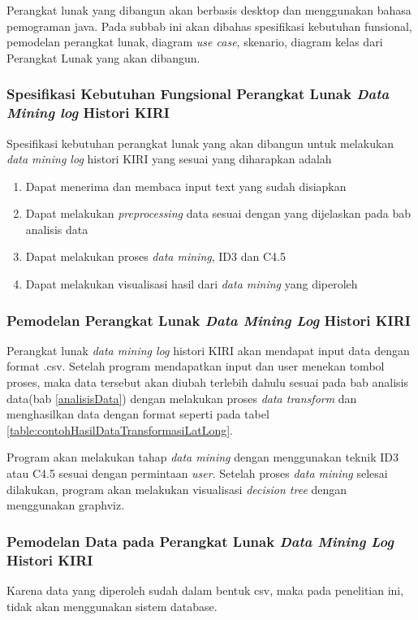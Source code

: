 Perangkat lunak yang dibangun akan berbasis desktop dan menggunakan bahasa pemograman java. Pada subbab ini akan dibahas spesifikasi kebutuhan funsional, pemodelan perangkat lunak, diagram \textsl{use case}, skenario, diagram kelas dari Perangkat Lunak yang akan dibangun.

\subsubsection{Spesifikasi Kebutuhan Fungsional Perangkat Lunak \textsl{Data Mining log} Histori KIRI}
Spesifikasi kebutuhan perangkat lunak yang akan dibangun untuk melakukan \textsl{data mining log} histori KIRI yang sesuai yang diharapkan adalah
\begin{enumerate}
	\item Dapat menerima dan membaca input text yang sudah disiapkan
	\item Dapat melakukan \textsl{preprocessing} data sesuai dengan yang dijelaskan pada bab analisis data
	\item Dapat melakukan proses \textsl{data mining}, ID3 dan C4.5
	\item Dapat melakukan visualisasi hasil dari \textsl{data mining} yang diperoleh
\end{enumerate}

\subsubsection{Pemodelan Perangkat Lunak \textsl{Data Mining Log} Histori KIRI}
Perangkat lunak \textsl{data mining log} histori KIRI akan mendapat input data dengan format .csv. Setelah program mendapatkan input dan user menekan tombol proses, maka data tersebut akan diubah terlebih dahulu sesuai pada bab analisis data(bab \ref{analisisData}) dengan melakukan proses \textsl{data transform} dan menghasilkan data dengan format seperti pada tabel \ref{table:contohHasilDataTransformasiLatLong}.

Program akan melakukan tahap \textsl{data mining} dengan menggunakan teknik ID3 atau C4.5 sesuai dengan permintaan \textsl{user}. Setelah proses \textsl{data mining} selesai dilakukan, program akan melakukan visualisasi \textsl{decision tree} dengan menggunakan graphviz.  

\subsubsection{Pemodelan Data pada Perangkat Lunak \textsl{Data Mining Log} Histori KIRI}
Karena data yang diperoleh sudah dalam bentuk csv, maka pada penelitian ini, tidak akan menggunakan sistem database. 

